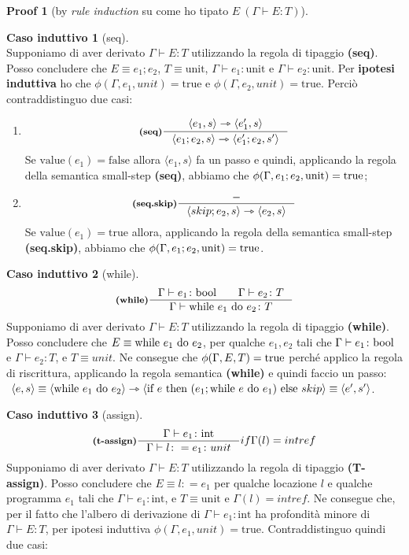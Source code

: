\documentclass[a4paper, 10pt]{article}
\newcommand{\bool}{\textup{bool}}
\theoremstyle{definition}
\newtheorem{prf}{Proof}[]
\newtheorem{ind}{Caso induttivo}
\newcommand{\infer}[4]{\inference[\textbf{#1}]{#2}{#3}#4 }
\newcommand{\srule}[2]{\langle #1 \rangle \rightarrowtriangle \langle #2 \rangle}
\begin{document}
\begin{multicols}{2}
\begin{prf}[by \textit{rule induction} su come ho tipato $ E\ (\Gamma \vdash E\colon T) $]
\begin{ind}[seq]
\[		\]
		Supponiamo di aver derivato $ \Gamma \vdash E\colon T $ utilizzando la regola di tipaggio \textbf{(seq)}. Posso concludere che $ E\equiv e_1;e_2 $, $ T\equiv \text{unit} $, $ \Gamma\vdash e_1 \colon \text{unit} $ e $ \Gamma\vdash e_2 \colon \text{unit} $.  Per \textbf{ipotesi induttiva} ho che $ \phi(\Gamma, e_1, unit)= \text{true} $ e $ \phi(\Gamma, e_2, unit)= \text{true} $. Perciò contraddistinguo due casi:
		\begin{enumerate}
			\item
			\[
				\infer{(seq)}{\srule{e_1,s}{e_1',s}}{\srule{e_1;e_2,s}{e_1';e_2,s'}}{}
			\]
			Se $ \text{value}(e_1) = \text{false} $ allora $ \langle e_1, s \rangle $ fa un passo e quindi, applicando la regola della semantica small-step \textbf{(seq)}, abbiamo che $ \phi(\Gamma, e_1;e_2, \text{unit}) = \textup{true} $;
			\item
			\[
				\infer{(seq.skip)}{-}{\srule{skip;e_2,s}{e_2,s}}{}
			\]
			Se $ \text{value}(e_1) = \text{true} $ allora, applicando la regola della semantica small-step \textbf{(seq.skip)}, abbiamo che $ \phi(\Gamma, e_1;e_2, \text{unit}) = \textup{true} $.
		\end{enumerate}
	\end{ind}
	\begin{ind}[while]
		\[
			\infer{(while)}{\Gamma\vdash e_1 \colon \bool\qquad \Gamma\vdash e_2 \colon T}{\Gamma \vdash\textup{while}\ e_1\ \textup{do}\ e_2\colon T}{}
		\]
		Supponiamo di aver derivato $ \Gamma \vdash E\colon T $ utilizzando la regola di tipaggio \textbf{(while)}. Posso concludere che $ E\equiv \textup{while}\ e_1\ \textup{do}\ e_2 $, per qualche $ e_1, e_2 $ tali che $ \Gamma\vdash e_1 \colon \bool $ e $ \Gamma\vdash e_2 \colon T $, e $ T\equiv unit $. Ne consegue che $ \phi(\Gamma, E, T) = \textup{true} $ perché applico la regola di riscrittura, applicando la regola semantica \textbf{(while)} e quindi faccio un passo:
		$ \ \langle e, s \rangle \equiv \srule{\textup{while}\ e_1\ \textup{do}\ e_2}{\text{if } e \text{ then } (e_1; \text{while } e \text{ do } e_1) \text{ else } skip} \equiv \langle e', s'\rangle $.
	\end{ind}
	\columnbreak
	\begin{ind}[assign]
		\[
			\infer{(t-assign)}{\Gamma\vdash e_1\colon \text{int}}{\Gamma\vdash l\colon = e_1\colon unit}{if \Gamma(l) = intref}
		\]
		Supponiamo di aver derivato $ \Gamma\vdash E\colon T $ utilizzando la regola di tipaggio \textbf{(T-assign)}. Posso concludere che $ E\equiv l\colon = e_1 $ per qualche locazione $ l $ e qualche programma $ e_1 $ tali che $ \Gamma\vdash e_1 \colon \text{int} $, e $ T\equiv \text{unit} $ e $ \Gamma(l) = intref $. Ne consegue che, per il fatto che l'albero di derivazione di $ \Gamma\vdash e_1\colon \text{int} $ ha profondità minore di $ \Gamma\vdash E\colon T $, per ipotesi induttiva $ \phi(\Gamma, e_1, unit) =\text{true} $. Contraddistinguo quindi due casi:

\end{ind}
\end{prf}
\end{multicols}
\end{document}

